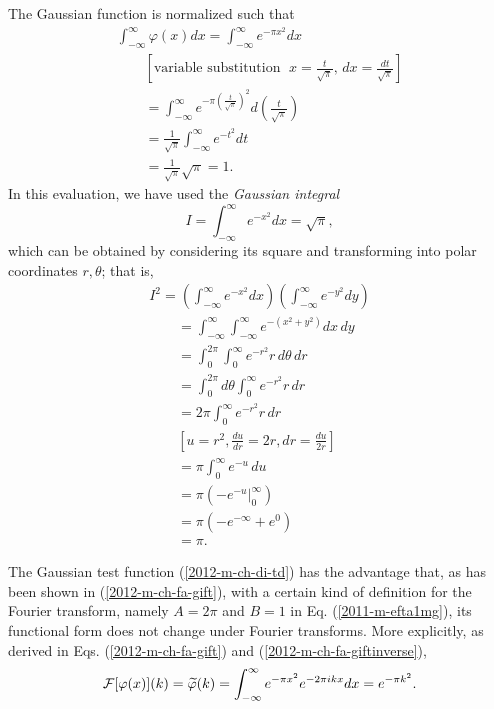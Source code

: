 The Gaussian function is normalized such that
\begin{equation}
\begin{split}
\int_{-\infty}^{ \infty} \varphi (x)dx =
\int_{-\infty}^{ \infty} e^{-\pi x^2}dx \\
\qquad [\textrm{variable substitution }\; x = \frac{t}{\sqrt{\pi}}, \, dx = \frac{dt}{\sqrt{\pi}} ]\\
\qquad
= \int_{-\infty}^{ \infty}  e^{-\pi \left(\frac{t}{\sqrt{\pi}}\right)^2}d\left(\frac{t}{\sqrt{\pi}}\right)  \\
\qquad
=\frac{1}{ \sqrt{\pi} } \int_{-\infty}^{ \infty}  e^{- t^2}dt  \\
\qquad
=\frac{1}{\sqrt{\pi} } \sqrt{\pi} = 1.
\end{split}
\end{equation}
In this evaluation, we have used the {\em Gaussian integral}
\begin{equation}
I= \int_{-\infty}^{ \infty}  e^{-x^2}dx=   \sqrt{\pi},
\label{2018-m-ch-di-gi}
\end{equation}
which can be obtained by considering its square and transforming into polar coordinates $r,\theta$; that  is,
\begin{equation}
\begin{split}
I^2 =
\left(\int_{-\infty}^{ \infty}  e^{-x^2}dx\right)\left(\int_{-\infty}^{ \infty}  e^{-y^2}dy\right)  \\
\qquad =
 \int_{-\infty}^{ \infty} \int_{-\infty}^{ \infty}   e^{-\left(x^2+y^2\right)}dx \,dy   \\
\qquad =
 \int_{0}^{2\pi } \int_{0}^{ \infty}   e^{-r^2}r \, d\theta \,dr   \\
\qquad =
 \int_{0}^{2\pi }  d\theta \int_{0}^{ \infty}   e^{-r^2}r  \,dr   \\
\qquad =
 2\pi   \int_{0}^{ \infty}   e^{-r^2}r  \,dr   \\
\qquad
\left[
u=r^2, \frac{du}{dr} =2r, dr =  \frac{du}{2r}
\right]   \\
\qquad =
  \pi   \int_{0}^{ \infty}   e^{-u}  \,du  \\
\qquad =
  \pi     \left( \left. - e^{-u} \right|_{0}^{ \infty} \right)  \\
\qquad =
  \pi     \left( - e^{-\infty} + e^{0} \right)  \\
\qquad =
  \pi .
\end{split}
\label{2012-m-ch-di-gi2}
\end{equation}

The  Gaussian  test function (\ref{2012-m-ch-di-td})
has the advantage that, as has been shown in
(\ref{2012-m-ch-fa-gift}),
with a certain kind of definition for the Fourier transform,
namely  $A=2\pi $ and $B=1$  in Eq. (\ref{2011-m-efta1mg}),
its functional form does not change under Fourier transforms.
More explicitly, as derived in Eqs.
(\ref{2012-m-ch-fa-gift})
and
(\ref{2012-m-ch-fa-giftinverse}),
\begin{equation}
    {\cal F}[\varphi (x)](k)=\widetilde{\varphi} (k) =  \int_{-\infty}^\infty
                e^{-\pi  x^2}  e^{- 2\pi ikx} dx
 = e^{-{\pi k^2}} .
\end{equation}

